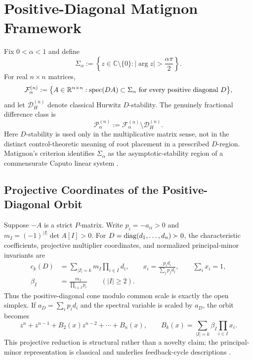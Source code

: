\section{Positive-Diagonal Matignon Framework}\label{sec:framework}

Fix \(0<\alpha<1\) and define
\begin{equation}
 \Sigma_\alpha
 :=
 \left\{z\in\mathbb C\setminus\{0\}:|\arg z|>\frac{\alpha\pi}{2}\right\}.
\end{equation}
For real \(n\times n\) matrices,
\begin{equation}
 \mathcal F_\alpha^{(n)}
 :=
 \left\{
 A\in\mathbb R^{n\times n}:
 \spec(DA)\subset\Sigma_\alpha
 \ \text{for every positive diagonal }D
 \right\},
 \label{eq:Falpha}
\end{equation}
and let \(\mathcal D_H^{(n)}\) denote classical Hurwitz \(D\)-stability. The genuinely fractional difference class is
\begin{equation}
 \mathcal P_\alpha^{(n)}
 :=
 \mathcal F_\alpha^{(n)}\setminus\mathcal D_H^{(n)}.
 \label{eq:Palpha}
\end{equation}
Here \(D\)-stability is used only in the multiplicative matrix sense, not in the distinct control-theoretic meaning of root placement in a prescribed \(D\)-region. Matignon's criterion identifies \(\Sigma_\alpha\) as the asymptotic-stability region of a commensurate Caputo linear system \cite{Matignon1996,BrandiburGarrappaKaslik2021}.

\subsection{Projective Coordinates of the Positive-Diagonal Orbit}

Suppose \(-A\) is a strict \(P\)-matrix. Write \(p_i=-a_{ii}>0\) and \(m_I=(-1)^{|I|}\det A[I]>0\). For \(D=\operatorname{diag}(d_1,\ldots,d_n)\succ0\), the characteristic coefficients, projective multiplier coordinates, and normalized principal-minor invariants are
\begin{align}
 c_k(D)&=\sum_{|I|=k}m_I\prod_{i\in I}d_i,\qquad
 x_i=\frac{p_id_i}{\sum_jp_jd_j},\qquad \sum_i x_i=1,\label{eq:orbit-compact}\\
 \beta_I&=\frac{m_I}{\prod_{i\in I}p_i}\qquad(|I|\ge2).
\end{align}
Thus the positive-diagonal cone modulo common scale is exactly the open simplex. If \(a_D=\sum_ip_id_i\) and the spectral variable is scaled by \(a_D\), the orbit becomes
\begin{equation}
 z^n+z^{n-1}+B_2(x)z^{n-2}+\cdots+B_n(x),
 \qquad
 B_k(x)=\sum_{|I|=k}\beta_I\prod_{i\in I}x_i.
 \label{eq:normalized-general}
\end{equation}
This projective reduction is structural rather than a novelty claim; the principal-minor representation is classical and underlies feedback-cycle descriptions \cite{Kinkhabwala2015}.

